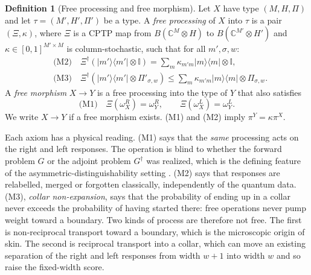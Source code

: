 \documentclass[11pt]{article}
\theoremstyle{definition}
\newtheorem{definition}{Definition}
\theoremstyle{remark}
\newcommand{\one}{\mathbb{I}}
\newcommand{\proj}[1]{|#1\rangle\!\langle #1|}
\begin{document}
\begin{definition}[Free processing and free morphism]\label{def:mor}
Let $X$ have type $(M,H,\Pi)$ and let $\tau=(M',H',\Pi')$ be a type. A \emph{free processing} of $X$ into $\tau$ is a pair $(\Xi,\kappa)$, where $\Xi$ is a CPTP map from $B(\mathbb C^M\otimes H)$ to $B(\mathbb C^{M'}\otimes H')$ and $\kappa\in[0,1]^{M'\times M}$ is column-stochastic, such that for all $m',\sigma,w$:
\begin{align*}
&\text{(M2)}\quad \Xi^\dagger(\proj{m'}\otimes\one)=\textstyle\sum_m\kappa_{m'm}\proj m\otimes\one,\\
&\text{(M3)}\quad \Xi^\dagger(\proj{m'}\otimes\Pi'_{\sigma,w})\le\textstyle\sum_m\kappa_{m'm}\proj m\otimes\Pi_{\sigma,w}.
\end{align*}
A \emph{free morphism} $X\to Y$ is a free processing into the type of $Y$ that also satisfies
\[
\text{(M1)}\quad \Xi(\omega^R_X)=\omega^R_Y,\qquad \Xi(\omega^L_X)=\omega^L_Y .
\]
We write $X\to Y$ if a free morphism exists. (M1) and (M2) imply $\pi^Y=\kappa\pi^X$.
\end{definition}

Each axiom has a physical reading. (M1) says that the \emph{same} processing acts on the right and left responses. The operation is blind to whether the forward problem $G$ or the adjoint problem $G^\dagger$ was realized, which is the defining feature of the asymmetric-distinguishability setting \cite{WW19}. (M2) says that responses are relabelled, merged or forgotten classically, independently of the quantum data. (M3), \emph{collar non-expansion}, says that the probability of ending up in a collar never exceeds the probability of having started there: free operations never pump weight toward a boundary. Two kinds of process are therefore not free. The first is non-reciprocal transport toward a boundary, which is the microscopic origin of skin. The second is reciprocal transport into a collar, which can move an existing separation of the right and left responses from width $w+1$ into width $w$ and so raise the fixed-width score.
\end{document}
